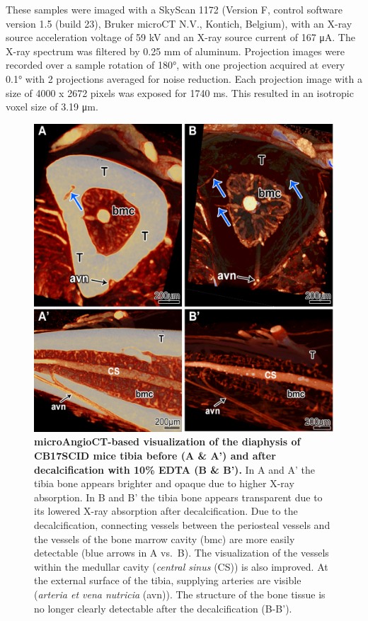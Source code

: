 These samples were imaged with a SkyScan 1172 (Version F, control software version 1.5 (build 23), Bruker microCT N.V., Kontich, Belgium), with an X-ray source acceleration voltage of 59 kV and an X-ray source current of 167 μA.
The X-ray spectrum was filtered by 0.25 mm of aluminum.
Projection images were recorded over a sample rotation of 180°, with one projection acquired at every 0.1° with 2 projections averaged for noise reduction.
Each projection image with a size of 4000 x 2672 pixels was exposed for 1740 ms.
This resulted in an isotropic voxel size of 3.19 μm.

\begin{figure}
\hypertarget{fig:2}{%
\centering
\includegraphics{images/Fig2_Decalcification.png}
\caption{\textbf{microAngioCT-based visualization of the diaphysis of CB17SCID mice tibia before (A \& A') and after decalcification with 10\% EDTA (B \& B').}
In A and A' the tibia bone appears brighter and opaque due to higher X-ray absorption.
In B and B' the tibia bone appears transparent due to its lowered X-ray absorption after decalcification.
Due to the decalcification, connecting vessels between the periosteal vessels and the vessels of the bone marrow cavity (bmc) are more easily detectable (blue arrows in A vs.~B).
The visualization of the vessels within the medullar cavity (\emph{central sinus} (CS)) is also improved.
At the external surface of the tibia, supplying arteries are visible (\emph{arteria et vena nutricia} (avn)).
The structure of the bone tissue is no longer clearly detectable after the decalcification (B-B').}\label{fig:2}
}
\end{figure}

